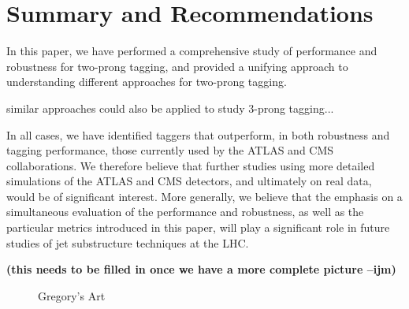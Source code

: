 \documentclass[11pt,letterpaper]{article}
\newcommand{\ijm}[1]{\textbf{\textcolor{llblue}{(#1 --ijm)}}}
\begin{document}
\section{Summary and Recommendations}\label{sec:conc}

In this paper, we have performed a comprehensive study of performance and robustness for two-prong tagging, and provided a unifying approach to understanding different approaches for two-prong tagging. 

similar approaches could also be applied to study $3$-prong tagging...


In all cases, we have identified taggers that outperform, in both robustness and tagging performance, those currently used by the ATLAS and CMS collaborations. We therefore believe that further studies using more detailed simulations of the ATLAS and CMS detectors, and ultimately on real data, would be of significant interest. More generally, we believe that the emphasis on a simultaneous evaluation of the performance and robustness, as well as the particular metrics introduced in this paper, will play a significant role in future studies of jet substructure techniques at the LHC.

\ijm{this needs to be filled in once we have a more complete picture}




\begin{figure}
\begin{center}
\qquad
{}
\end{center}
\caption{Gregory's Art
}
\label{fig:phasespace}
\end{figure}
\end{document}
